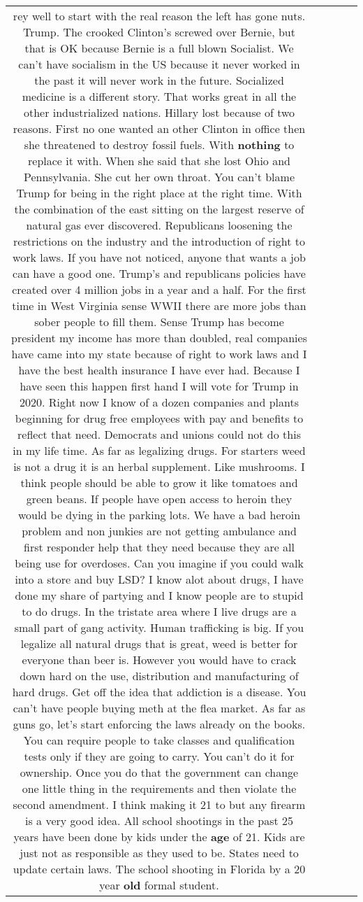 \documentclass[11pt]{article}
\newlength\mylength
\begin{document}
\begin{center}
\begin{longtable}{|C{.65\mylength}|C{.30\mylength}|C{.12\mylength}|C{.12\mylength}|C{.12\mylength}|}
  \small rey well to start with the real reason the left has gone nuts. Trump. The crooked Clinton's screwed over Bernie, but that is OK because Bernie is a full blown Socialist. We can't have socialism in the US because it never worked in the past it will never work in the future. Socialized medicine is a different story. That works great in all the other industrialized nations. Hillary lost because of two reasons. First no one wanted an other Clinton in office then she threatened to destroy fossil fuels. With \textbf{nothing} to replace it with. When she said that she lost Ohio and Pennsylvania. She cut her own throat. You can't blame Trump for being in the right place at the right time. With the combination of the east sitting on the largest reserve of natural gas ever discovered. Republicans loosening the restrictions on the industry and the introduction of right to work laws. If you have not noticed, anyone that wants a job can have a good one. Trump's and republicans policies have created over 4 million jobs in a year and a half. For the first time in West Virginia sense WWII there are more jobs than sober people to fill them. Sense Trump has become president my income has more than doubled, real companies have came into my state because of right to work laws and I have the best health insurance I have ever had. Because I have seen this happen first hand I will vote for Trump in 2020. Right now I know of a dozen companies and plants beginning for drug free employees with pay and benefits to reflect that need. Democrats and unions could not do this in my life time. As far as legalizing drugs. For starters weed is not a drug it is an herbal supplement. Like mushrooms. I think people should be able to grow it like tomatoes and green beans. If people have open access to heroin they would be dying in the parking lots. We have a bad heroin problem and non junkies are not getting ambulance and first responder help that they need because they are all being use for overdoses. Can you imagine if you could walk into a store and buy LSD? I know alot about drugs, I have done my share of partying and I know people are to stupid to do drugs. In the tristate area where I live drugs are a small part of gang activity. Human trafficking is big. If you legalize all natural drugs that is great, weed is better for everyone than beer is. However you would have to crack down hard on the use, distribution and manufacturing of hard drugs. Get off the idea that addiction is a disease. You can't have people buying meth at the flea market. As far as guns go, let's start enforcing the laws already on the books. You can require people to take classes and qualification tests only if they are going to carry. You can't do it for ownership. Once you do that the government can change one little thing in the requirements and then violate the second amendment. I think making it 21 to but any firearm is a very good idea. All school shootings in the past 25 years have been done by kids under the \textbf{age} of 21. Kids are just not as responsible as they used to be. States need to update certain laws. The school shooting in Florida by a 20 year \textbf{old} formal student. 
\end{longtable}
\end{center}
\end{document}
